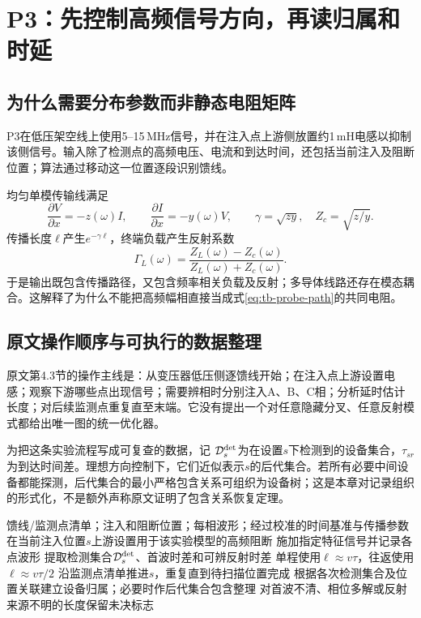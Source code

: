 \section{P3：先控制高频信号方向，再读归属和时延}
\label{sec:tb-P3}

\subsection{为什么需要分布参数而非静态电阻矩阵}

P3\citep{P3}在低压架空线上使用5--15\,MHz信号，并在注入点上游侧放置约1\,mH电感以抑制该侧信号。输入除了检测点的高频电压、电流和到达时间，还包括当前注入及阻断位置；算法通过移动这一位置逐段识别馈线。

均匀单模传输线满足
\[
 \frac{\partial V}{\partial x}=-z(\omega)I,\qquad
 \frac{\partial I}{\partial x}=-y(\omega)V,\qquad
 \gamma=\sqrt{zy},\quad Z_c=\sqrt{z/y}.
\]
传播长度$\ell$产生$e^{-\gamma\ell}$，终端负载产生反射系数
\begin{equation}
 \Gamma_L(\omega)=\frac{Z_L(\omega)-Z_c(\omega)}
                       {Z_L(\omega)+Z_c(\omega)}.
 \label{eq:tb-P3-reflect}
\end{equation}
于是输出既包含传播路径，又包含频率相关负载及反射；多导体线路还存在模态耦合。这解释了为什么不能把高频幅相直接当成式\eqref{eq:tb-probe-path}的共同电阻。

\subsection{原文操作顺序与可执行的数据整理}

原文第4.3节的操作主线是：从变压器低压侧逐馈线开始；在注入点上游设置电感；观察下游哪些点出现信号；需要辨相时分别注入A、B、C相；分析延时估计长度；对后续监测点重复直至末端。它没有提出一个对任意隐藏分叉、任意反射模式都给出唯一图的统一优化器。

为把这条实验流程写成可复查的数据，记
$\mathcal D_s^{\rm det}$为在设置$s$下检测到的设备集合，$\tau_{sr}$为到达时间差。理想方向控制下，它们近似表示$s$的后代集合。若所有必要中间设备都能探测，后代集合的最小严格包含关系可组织为设备树；这是本章对记录组织的形式化，不是额外声称原文证明了包含关系恢复定理。

\begin{algorithm}[htbp]
\caption{P3的实验扫描主线：原文步骤加教材记录格式}
\label{alg:tb-P3}
\begin{algorithmic}[1]
\Require 馈线/监测点清单；注入和阻断位置；每相波形；经过校准的时间基准与传播参数
 \State 在当前注入位置$s$上游设置用于该实验模型的高频阻断
  \State 施加指定特征信号并记录各点波形
  \State 提取检测集合$\mathcal D_s^{\rm det}$、首波时差和可辨反射时差
  \State 单程使用$\ell\approx v\tau$，往返使用$\ell\approx v\tau/2$
 \EndFor
 \State 沿监测点清单推进$s$，重复直到待扫描位置完成
\EndFor
\State 根据各次检测集合及位置关联建立设备归属；必要时作后代集合包含整理
\State 对首波不清、相位多解或反射来源不明的长度保留未决标志
\end{algorithmic}
\end{algorithm}

